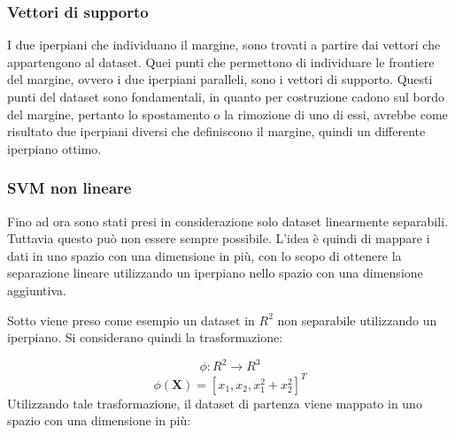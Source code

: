 \documentclass[oneside]{book}
\begin{document}
\subsubsection{Vettori di supporto}
I due iperpiani che individuano il margine, sono trovati a partire dai vettori che appartengono al dataset. Quei punti che permettono di individuare le frontiere del margine, ovvero i due iperpiani paralleli, sono i vettori di supporto. Questi punti del dataset sono fondamentali, in quanto per costruzione cadono sul bordo del margine, pertanto lo spostamento o la rimozione di uno di essi, avrebbe come risultato due iperpiani diversi che definiscono il margine, quindi un differente iperpiano ottimo.

\subsubsection{SVM non lineare}
Fino ad ora sono stati presi in considerazione solo dataset linearmente separabili. Tuttavia questo può non essere sempre possibile. L'idea è quindi di mappare i dati in uno spazio con una dimensione in più, con lo scopo di ottenere la separazione lineare utilizzando un iperpiano nello spazio con una dimensione aggiuntiva.

Sotto viene preso come esempio un dataset in $R^2$ non separabile utilizzando un iperpiano. Si considerano quindi la trasformazione:


$$\phi \colon R^2 \to R^3$$
$$\phi(\boldsymbol{X})  = [x_1, x_2, x_1^2 + x_2^2]^T$$ 
Utilizzando tale trasformazione, il dataset di partenza viene mappato in uno spazio con una dimensione in più:
\end{document}
